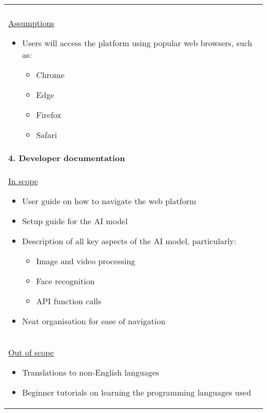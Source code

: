 \begin{longtable}{ | p{} l | }
{\begin{itemize}
        \end{itemize}
    } \\
    \multicolumn{2}{|p{\textwidth}|}{\hspace{0.6cm}\underline{Assumptions}
        \begin{itemize}
            \item Users will access the platform using popular web browsers, such as:
                \begin{itemize}
                    \item Chrome
                    \item Edge
                    \item Firefox
                    \item Safari
                \end{itemize}
        \end{itemize}
    } \\
    \multicolumn{2}{|p{\textwidth}|}{\textbf{4. Developer documentation}} \\
    \multicolumn{2}{|p{\textwidth}|}{\hspace{0.6cm}\underline{In scope}
        \begin{itemize}
            \item User guide on how to navigate the web platform
            \item Setup guide for the AI model
            \item Description of all key aspects of the AI model, particularly:
                \begin{itemize}
                    \item Image and video processing
                    \item Face recognition
                    \item API function calls
                \end{itemize}
            \item Neat organisation for ease of navigation
        \end{itemize}
    } \\
    \multicolumn{2}{|p{\textwidth}|}{\hspace{0.6cm}\underline{Out of scope}
        \begin{itemize}
            \item Translations to non-English languages
            \item Beginner tutorials on learning the programming languages used
        \end{itemize}
}
\end{longtable}
